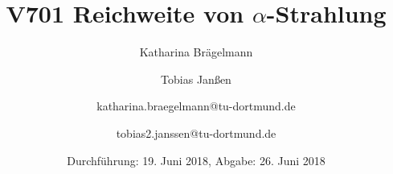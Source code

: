 
\title{V701 Reichweite von $\alpha$-Strahlung}
\author{Katharina Brägelmann \and Tobias Janßen \and katharina.braegelmann@tu-dortmund.de \and tobias2.janssen@tu-dortmund.de}
\date{Durchführung: 19. Juni 2018, Abgabe: 26. Juni 2018}
\maketitle

\tableofcontents
